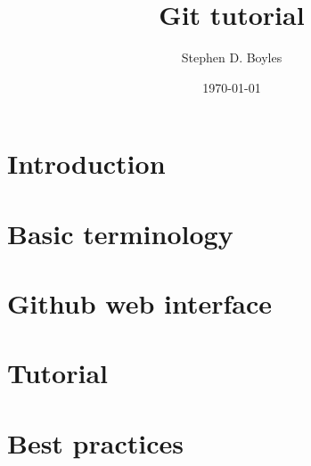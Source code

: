 \documentclass{article}
\title{Git tutorial}
\author{Stephen D. Boyles}
\date{\today}
\begin{document}
\maketitle

\section{Introduction}
\label{sec:introduction}

\section{Basic terminology}
\label{sec:terminology}

\section{Github web interface}
\label{sec:github}

\section{Tutorial}
\label{sec:tutorial}

\section{Best practices}
\label{sec:bestpractices}
\end{document}
